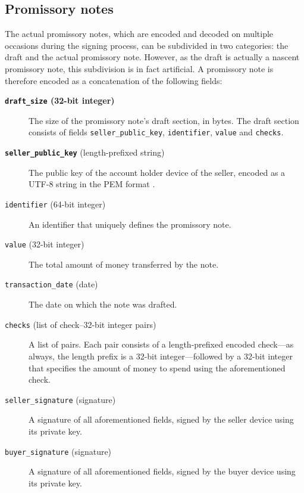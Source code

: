 \documentclass[12pt,a4paper]{article}
\begin{document}
\begin{multicols}{2}
	\subsection{Promissory notes}
 
 The actual promissory notes, which are encoded and decoded on multiple occasions during the signing process, can be subdivided in two categories: the draft and the actual promissory note. However, as the draft is actually a nascent promissory note, this subdivision is in fact artificial. A promissory note is therefore encoded as a concatenation of the following fields:
 
	 \begin{description}
	 	\item[\textbf{\texttt{draft\_size} (32-bit integer)}] The size of the promissory note's draft section, in bytes. The draft section consists of fields \texttt{seller\_public\_key}, \texttt{identifier}, \texttt{value} and \texttt{checks}.
	 	
		\item[\textbf{\texttt{seller\_public\_key}} (length-prefixed string)]  The public key of the account holder device of the seller, encoded as a UTF-8 string in the PEM format \cite{rfc-pem}.

		\item[\texttt{identifier} (64-bit integer)] An identifier that uniquely defines the promissory note.

		\item[\texttt{value} (32-bit integer)] The total amount of money transferred by the note.
		
		\item[\texttt{transaction\_date} (date)] The date on which the note was drafted.

		\item[\texttt{checks} (list of check--32-bit integer pairs)] A list of pairs. Each pair consists of a length-prefixed encoded check---as always, the length prefix is a 32-bit integer---followed by a 32-bit integer that specifies the amount of money to spend using the aforementioned check.

		\item[\texttt{seller\_signature} (signature)] A signature of all aforementioned fields, signed by the seller device using its private key.
		
		\item[\texttt{buyer\_signature} (signature)] A signature of all aforementioned fields, signed by the buyer device using its private key.
	\end{description}
 

\end{multicols}
\end{document}
